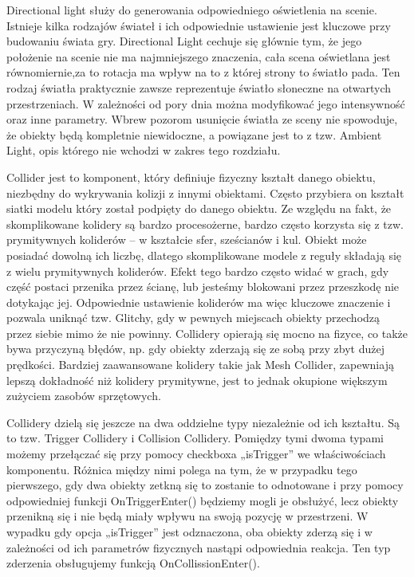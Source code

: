\documentclass[openright]{xmgr}
\begin{document}
Directional light służy do generowania odpowiedniego oświetlenia na scenie. Istnieje kilka rodzajów świateł i ich odpowiednie ustawienie jest kluczowe przy budowaniu świata gry. Directional Light cechuje się głównie tym, że jego położenie na scenie nie ma najmniejszego znaczenia, cała scena oświetlana jest równomiernie,za to rotacja ma wpływ na to z której strony to światło pada. Ten rodzaj światła praktycznie zawsze reprezentuje światło słoneczne na otwartych przestrzeniach. W zależności od pory dnia można modyfikować jego intensywność oraz inne parametry. Wbrew pozorom usunięcie światła ze sceny nie spowoduje, że obiekty będą kompletnie niewidoczne, a powiązane jest to z tzw. Ambient Light, opis którego nie wchodzi w zakres tego rozdziału.

Collider jest to komponent, który definiuje fizyczny kształt danego obiektu, niezbędny do wykrywania kolizji z innymi obiektami. Często przybiera on kształt siatki modelu który został podpięty do danego obiektu. Ze względu na fakt, że skomplikowane kolidery są bardzo procesożerne, bardzo często korzysta się z tzw. prymitywnych koliderów – w kształcie sfer, sześcianów i kul. Obiekt może posiadać dowolną ich liczbę, dlatego skomplikowane modele z reguły składają się z wielu prymitywnych koliderów. Efekt tego bardzo często widać w grach, gdy część postaci przenika przez ścianę, lub jesteśmy blokowani przez przeszkodę nie dotykając jej. Odpowiednie ustawienie koliderów ma więc kluczowe znaczenie i pozwala uniknąć tzw. Glitchy, gdy w pewnych miejscach obiekty przechodzą przez siebie mimo że nie powinny. Collidery opierają się mocno na fizyce, co także bywa przyczyną błędów, np. gdy obiekty zderzają się ze sobą przy zbyt dużej prędkości. Bardziej zaawansowane kolidery takie jak Mesh Collider, zapewniają lepszą dokładność niż kolidery prymitywne, jest to jednak okupione większym zużyciem zasobów sprzętowych.

Collidery dzielą się jeszcze na dwa  oddzielne typy niezależnie od ich kształtu. Są to tzw. Trigger Collidery i Collision Collidery. Pomiędzy tymi dwoma typami możemy przełączać się przy pomocy checkboxa „isTrigger” we właściwościach komponentu. Różnica między nimi polega na tym, że w przypadku tego pierwszego, gdy dwa obiekty zetkną się to zostanie to odnotowane i przy pomocy odpowiedniej funkcji OnTriggerEnter() będziemy mogli je obsłużyć, lecz obiekty przenikną się i nie będą miały wpływu na swoją pozycję w przestrzeni. W wypadku gdy opcja „isTrigger” jest odznaczona, oba obiekty zderzą się i w zależności od ich parametrów fizycznych nastąpi odpowiednia reakcja. Ten typ zderzenia obsługujemy funkcją OnCollissionEnter().
\end{document}
